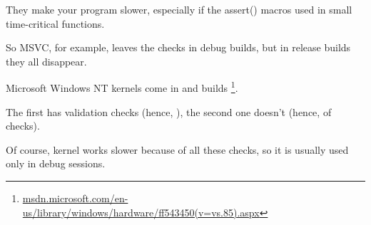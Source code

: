 They make your program slower, especially if the assert() macros used in small time-critical functions.

So MSVC, for example, leaves the checks in debug builds, but in release builds they all disappear.
 
Microsoft \gls{Windows NT} kernels come in  and  builds
\footnote{\href{http://go.yurichev.com/17259}{msdn.microsoft.com/en-us/library/windows/hardware/ff543450(v=vs.85).aspx}}.

The first has validation checks (hence, ), the second one doesn't (hence,  of checks).

Of course,  kernel works slower because of all these checks, so it is usually used only in debug sessions.

